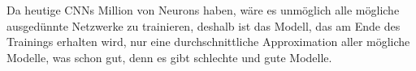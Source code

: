 \documentclass[12pt,a4paper]{scrartcl}
\numberwithin{equation}{section}
\begin{document}
Da heutige \acsp{CNN} Million von Neurons haben, wäre es unmöglich alle mögliche ausgedünnte Netzwerke zu trainieren, deshalb ist das Modell, das am Ende des Trainings erhalten wird, nur eine durchschnittliche Approximation aller mögliche Modelle, was schon gut, denn es gibt schlechte und gute Modelle.
\end{document}
